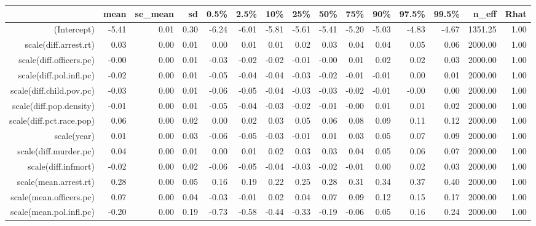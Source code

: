\begin{table}[ht]
\centering
\begin{tabular}{rrrrrrrrrrrrrrr}
  \hline
 & mean & se\_mean & sd & 0.5\% & 2.5\% & 10\% & 25\% & 50\% & 75\% & 90\% & 97.5\% & 99.5\% & n\_eff & Rhat \\ 
  \hline
(Intercept) & -5.41 & 0.01 & 0.30 & -6.24 & -6.01 & -5.81 & -5.61 & -5.41 & -5.20 & -5.03 & -4.83 & -4.67 & 1351.25 & 1.00 \\ 
  scale(diff.arrest.rt) & 0.03 & 0.00 & 0.01 & 0.00 & 0.01 & 0.01 & 0.02 & 0.03 & 0.04 & 0.04 & 0.05 & 0.06 & 2000.00 & 1.00 \\ 
  scale(diff.officers.pc) & -0.00 & 0.00 & 0.01 & -0.03 & -0.02 & -0.02 & -0.01 & -0.00 & 0.01 & 0.02 & 0.02 & 0.03 & 2000.00 & 1.00 \\ 
  scale(diff.pol.infl.pc) & -0.02 & 0.00 & 0.01 & -0.05 & -0.04 & -0.04 & -0.03 & -0.02 & -0.01 & -0.01 & 0.00 & 0.01 & 2000.00 & 1.00 \\ 
  scale(diff.child.pov.pc) & -0.03 & 0.00 & 0.01 & -0.06 & -0.05 & -0.04 & -0.03 & -0.03 & -0.02 & -0.01 & -0.00 & 0.00 & 2000.00 & 1.00 \\ 
  scale(diff.pop.density) & -0.01 & 0.00 & 0.01 & -0.05 & -0.04 & -0.03 & -0.02 & -0.01 & -0.00 & 0.01 & 0.01 & 0.02 & 2000.00 & 1.00 \\ 
  scale(diff.pct.race.pop) & 0.06 & 0.00 & 0.02 & 0.00 & 0.02 & 0.03 & 0.05 & 0.06 & 0.08 & 0.09 & 0.11 & 0.12 & 2000.00 & 1.00 \\ 
  scale(year) & 0.01 & 0.00 & 0.03 & -0.06 & -0.05 & -0.03 & -0.01 & 0.01 & 0.03 & 0.05 & 0.07 & 0.09 & 2000.00 & 1.00 \\ 
  scale(diff.murder.pc) & 0.04 & 0.00 & 0.01 & 0.00 & 0.01 & 0.02 & 0.03 & 0.03 & 0.04 & 0.05 & 0.06 & 0.07 & 2000.00 & 1.00 \\ 
  scale(diff.infmort) & -0.02 & 0.00 & 0.02 & -0.06 & -0.05 & -0.04 & -0.03 & -0.02 & -0.01 & 0.00 & 0.02 & 0.03 & 2000.00 & 1.00 \\ 
  scale(mean.arrest.rt) & 0.28 & 0.00 & 0.05 & 0.16 & 0.19 & 0.22 & 0.25 & 0.28 & 0.31 & 0.34 & 0.37 & 0.40 & 2000.00 & 1.00 \\ 
  scale(mean.officers.pc) & 0.07 & 0.00 & 0.04 & -0.03 & -0.01 & 0.02 & 0.04 & 0.07 & 0.09 & 0.12 & 0.15 & 0.17 & 2000.00 & 1.00 \\ 
  scale(mean.pol.infl.pc) & -0.20 & 0.00 & 0.19 & -0.73 & -0.58 & -0.44 & -0.33 & -0.19 & -0.06 & 0.05 & 0.16 & 0.24 & 2000.00 & 1.00 \\ 

\end{tabular}
\end{table}
